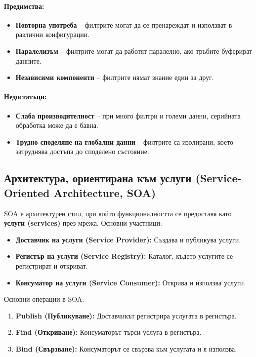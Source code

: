 \documentclass{scrartcl}
\begin{document}
\begin{FlushLeft}
\paragraph{Предимства:}
\begin{itemize}
    \item \textbf{Повторна употреба} – филтрите могат да се пренареждат и използват в различни конфигурации.
    \item \textbf{Паралелизъм} – филтрите могат да работят паралелно, ако тръбите буферират данните.
    \item \textbf{Независими компоненти} – филтрите нямат знание един за друг.
\end{itemize}

\paragraph{Недостатъци:}
\begin{itemize}
    \item \textbf{Слаба производителност} – при много филтри и големи данни, серийната обработка може да е бавна.
    \item \textbf{Трудно споделяне на глобални данни} – филтрите са изолирани, което затруднява достъпа до споделено състояние.
\end{itemize}

\subsection{Архитектура, ориентирана към услуги (Service-Oriented Architecture, SOA)}

SOA е архитектурен стил, при който функционалността се предоставя като \textbf{услуги (services)} през мрежа. Основни участници:
\begin{itemize}
    \item \textbf{Доставчик на услуги (Service Provider):} Създава и публикува услуги.
    \item \textbf{Регистър на услуги (Service Registry):} Каталог, където услугите се регистрират и откриват.
    \item \textbf{Консуматор на услуги (Service Consumer):} Открива и използва услуги.
\end{itemize}

Основни операции в SOA:
\begin{enumerate}
    \item \textbf{Publish (Публикуване):} Доставчикът регистрира услугата в регистъра.
    \item \textbf{Find (Откриване):} Консуматорът търси услуга в регистъра.
    \item \textbf{Bind (Свързване):} Консуматорът се свързва към услугата и я използва.
\end{enumerate}


\end{FlushLeft}
\end{document}
